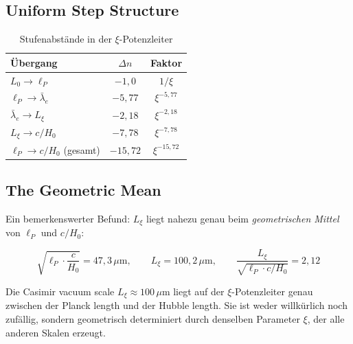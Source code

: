\subsection{Uniform Step Structure}

\begin{table}[H]
    \centering
    \caption{Stufenabstände in der $\xi$-Potenzleiter}
    \label{tab:steps}
    \begin{tabular}{lcc}
        \toprule
        \textbf{Übergang} & \textbf{$\Delta n$} & \textbf{Faktor} \\
        \midrule
        $L_0 \to \ell_P$        & $-1{,}0$ & $1/\xi$            \\
        $\ell_P \to \bar\lambda_e$ & $-5{,}77$ & $\xi^{-5{,}77}$ \\
        $\bar\lambda_e \to L_\xi$ & $-2{,}18$ & $\xi^{-2{,}18}$ \\
        $L_\xi \to c/H_0$        & $-7{,}78$ & $\xi^{-7{,}78}$ \\
        \midrule
        $\ell_P \to c/H_0$ (gesamt) & $-15{,}72$ & $\xi^{-15{,}72}$ \\
        \bottomrule
    \end{tabular}
\end{table}

\subsection{The Geometric Mean}

Ein bemerkenswerter Befund: $L_\xi$ liegt nahezu genau beim
\emph{geometrischen Mittel} von $\ell_P$ und $c/H_0$:

\begin{equation}
    \sqrt{\ell_P \cdot \frac{c}{H_0}} = 47{,}3\,\mu\text{m},
    \qquad
    L_\xi = 100{,}2\,\mu\text{m},
    \qquad
    \frac{L_\xi}{\sqrt{\ell_P \cdot c/H_0}} = 2{,}12
    \label{eq:geom_mean}
\end{equation}

\begin{insightBox}
    Die Casimir vacuum scale $L_\xi \approx 100\,\mu\text{m}$ liegt auf der
    $\xi$-Potenzleiter genau zwischen der Planck length und der Hubble length.
    Sie ist weder willkürlich noch zufällig, sondern geometrisch determiniert
    durch denselben Parameter $\xi$, der alle anderen Skalen erzeugt.
\end{insightBox}

